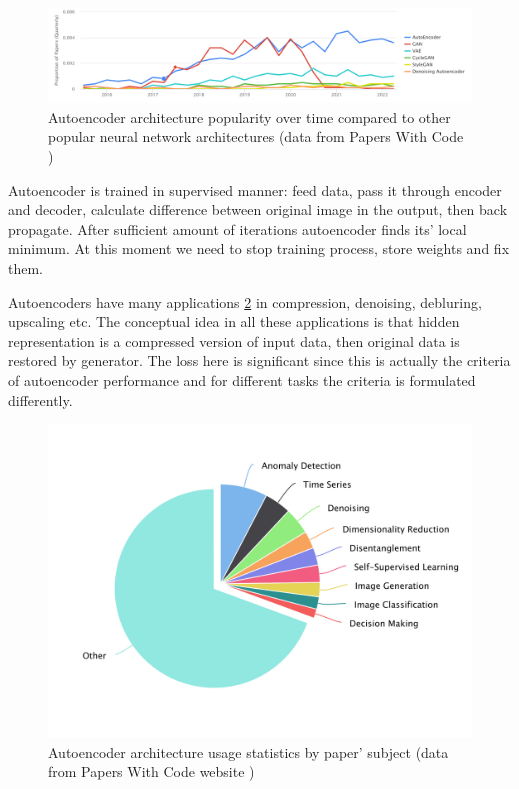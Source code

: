 \begin{figure}[!ht]
    \centering
    \includegraphics[width=\textwidth]{figure/autoencoder-popularity-over-time.png}
    \caption{Autoencoder architecture popularity over time compared to other popular neural network architectures (data from Papers With Code \cite{autoencoder_papers})}
    \label{autoencoder-popularity-dynamics}
\end{figure}

Autoencoder is trained in supervised manner: feed data, pass it through encoder and decoder, calculate difference between original image in the output, then back propagate. After sufficient amount of iterations autoencoder finds its' local minimum. At this moment we need to stop training process, store weights and fix them.

Autoencoders have many applications \ref{autoencoder-popularity-stats} in compression, denoising, debluring, upscaling etc. The conceptual idea in all these applications is that hidden representation is a compressed version of input data, then original data is restored by generator. The loss here is significant since this is actually the criteria of autoencoder performance and for different tasks the criteria is formulated differently.

\begin{figure}[!ht]
    \centering
    \includegraphics[width=\textwidth]{figure/autoencoder-popularity-stats.png}
    \caption{Autoencoder architecture usage statistics by paper' subject (data from Papers With Code website \cite{autoencoder_papers})}
    \label{autoencoder-popularity-stats}
\end{figure}

